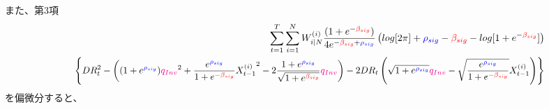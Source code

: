 \documentclass[a4j,11pt]{jarticle}
\begin{document}
また、第3項
\begin{eqnarray*}
&&\sum_{t=1}^{T}\sum_{i=1}^{N}W_{i|N}^{(i)}\frac{(1+e^{-\textcolor{red}{\beta_{sig}}})}{4e^{-\textcolor{red}{\beta_{sig}}+\textcolor{blue}{\rho_{sig}}}}
\left(log[2\pi]+\textcolor{blue}{\rho_{sig}}-\textcolor{red}{\beta_{sig}}-log[1+e^{-\textcolor{red}{\beta_{sig}}}]
\right)\\
&&
\scalebox{0.95}{$\displaystyle
\left\{DR_t^2-
\left((1+ e^{\textcolor{blue}{\rho_{sig}}} ) \textcolor{magenta}{q_{Inv}}^2+\frac{e^{\textcolor{blue}{\rho_{sig}}}}{1+e^{-\textcolor{red}{\beta_{sig}}}}{X_{t-1}^{(i)}}^2 - 2 \frac{1 + e^{\textcolor{blue}{\rho_{sig}}} }{\sqrt{1+e^{\textcolor{red}{\beta_{sig}}}} }\textcolor{magenta}{q_{Inv}}\right)
 - 2DR_t
\left(\sqrt{1+e^{\textcolor{blue}{\rho_{sig}}}} \textcolor{magenta}{q_{Inv}}-\sqrt{\frac{e^{\textcolor{blue}{\rho_{sig}}}}{1+e^{-\textcolor{red}{\beta_{sig}}}}}X_{t-1}^{(i)}\right)
 \right\}
$}
\end{eqnarray*}
を偏微分すると、
\end{document}
